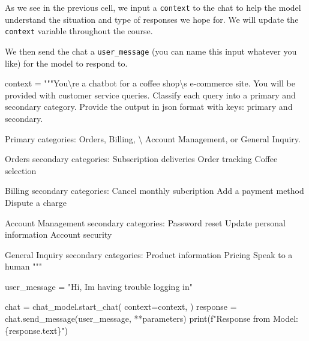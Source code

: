 \documentclass[
  letterpaper,
  DIV=11,
  numbers=noendperiod]{scrreprt}
\newenvironment{Shaded}{\begin{snugshade}}{\end{snugshade}}
\newcommand{\BuiltInTok}[1]{\textcolor[rgb]{0.00,0.23,0.31}{#1}}
\newcommand{\CharTok}[1]{\textcolor[rgb]{0.13,0.47,0.30}{#1}}
\newcommand{\NormalTok}[1]{\textcolor[rgb]{0.00,0.23,0.31}{#1}}
\newcommand{\OperatorTok}[1]{\textcolor[rgb]{0.37,0.37,0.37}{#1}}
\newcommand{\SpecialCharTok}[1]{\textcolor[rgb]{0.37,0.37,0.37}{#1}}
\newcommand{\SpecialStringTok}[1]{\textcolor[rgb]{0.13,0.47,0.30}{#1}}
\newcommand{\StringTok}[1]{\textcolor[rgb]{0.13,0.47,0.30}{#1}}
\begin{document}
As we see in the previous cell, we input a \texttt{context} to the chat
to help the model understand the situation and type of responses we hope
for. We will update the \texttt{context} variable throughout the course.

We then send the chat a \texttt{user\_message} (you can name this input
whatever you like) for the model to respond to.

\begin{Shaded}
\begin{Highlighting}[]
\NormalTok{context }\OperatorTok{=} \StringTok{"""You}\CharTok{\textbackslash{}\textquotesingle{}}\StringTok{re a chatbot for a coffee shop}\CharTok{\textbackslash{}\textquotesingle{}}\StringTok{s e{-}commerce site. You will be provided with customer service queries.}
\StringTok{Classify each query into a primary and secondary category.}
\StringTok{Provide the output in json format with keys: primary and secondary.}

\StringTok{Primary categories: Orders, Billing, }\CharTok{\textbackslash{}}
\StringTok{Account Management, or General Inquiry.}

\StringTok{Orders secondary categories:}
\StringTok{Subscription deliveries}
\StringTok{Order tracking}
\StringTok{Coffee selection}

\StringTok{Billing secondary categories:}
\StringTok{Cancel monthly subcription}
\StringTok{Add a payment method}
\StringTok{Dispute a charge}

\StringTok{Account Management secondary categories:}
\StringTok{Password reset}
\StringTok{Update personal information}
\StringTok{Account security}

\StringTok{General Inquiry secondary categories:}
\StringTok{Product information}
\StringTok{Pricing}
\StringTok{Speak to a human}
\StringTok{"""}

\NormalTok{user\_message }\OperatorTok{=} \StringTok{"Hi, I\textquotesingle{}m having trouble logging in"}

\NormalTok{chat }\OperatorTok{=}\NormalTok{ chat\_model.start\_chat(}
\NormalTok{    context}\OperatorTok{=}\NormalTok{context,}
\NormalTok{)}
\NormalTok{response }\OperatorTok{=}\NormalTok{ chat.send\_message(user\_message, }\OperatorTok{**}\NormalTok{parameters)}
\BuiltInTok{print}\NormalTok{(}\SpecialStringTok{f"Response from Model: }\SpecialCharTok{\{}\NormalTok{response}\SpecialCharTok{.}\NormalTok{text}\SpecialCharTok{\}}\SpecialStringTok{"}\NormalTok{)}
\end{Highlighting}
\end{Shaded}
\end{document}
